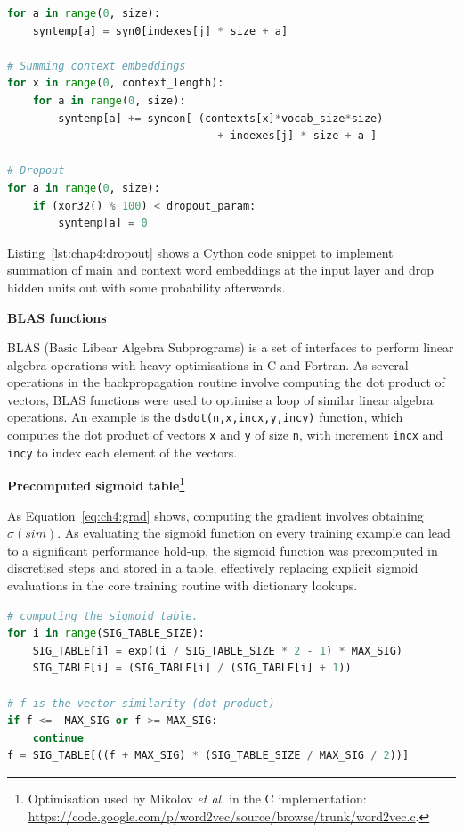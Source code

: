 \documentclass[a4paper,12pt,twoside,openright]{report}
\newcommand{\tb}{\vspace{10pt} \textbf}
\newcommand{\ti}{\textit}
\newcommand{\tx}{\texttt}
\begin{document}
\vspace{0.3cm}
\begin{lstlisting}[language=Python,caption={Cython code for dropout regularisation at the hidden layer.},label=lst:chap4:dropout]
for a in range(0, size):
    syntemp[a] = syn0[indexes[j] * size + a]

# Summing context embeddings 
for x in range(0, context_length):
    for a in range(0, size):
        syntemp[a] += syncon[ (contexts[x]*vocab_size*size)
        						 + indexes[j] * size + a ]

# Dropout
for a in range(0, size):
    if (xor32() % 100) < dropout_param:
        syntemp[a] = 0
\end{lstlisting}

Listing~\ref{lst:chap4:dropout} shows a Cython code snippet to implement summation of main and context word embeddings at the input layer and drop hidden units out with some probability afterwards.

\tb{BLAS functions}

BLAS (Basic Libear Algebra Subprograms) is a set of interfaces to perform linear algebra operations with heavy optimisations in C and Fortran. As several operations in the backpropagation routine involve computing the dot product of vectors, BLAS functions were used to optimise a loop of similar linear algebra operations. An example is the \tx{dsdot(n,x,incx,y,incy)} function, which computes the dot product of vectors \tx{x} and \tx{y} of size \tx{n}, with increment \tx{incx} and \tx{incy} to index each element of the vectors.

\tb{Precomputed sigmoid table}\footnote{Optimisation used by Mikolov \ti{et al.} in the C implementation: \url{https://code.google.com/p/word2vec/source/browse/trunk/word2vec.c}.}

As Equation~\ref{eq:ch4:grad} shows, computing the gradient involves obtaining $\sigma(sim)$. As evaluating the sigmoid function on every training example can lead to a significant performance hold-up, the sigmoid function was precomputed in discretised steps and stored in a table, effectively replacing explicit sigmoid evaluations in the core training routine with dictionary lookups.

\begin{lstlisting}[language=Python,caption={Cython code for precomputing and accessing sigmoid function.},label=lst:chap4:sigmoid]
# computing the sigmoid table.
for i in range(SIG_TABLE_SIZE):
	SIG_TABLE[i] = exp((i / SIG_TABLE_SIZE * 2 - 1) * MAX_SIG)
	SIG_TABLE[i] = (SIG_TABLE[i] / (SIG_TABLE[i] + 1))

# f is the vector similarity (dot product)
if f <= -MAX_SIG or f >= MAX_SIG:
	continue
f = SIG_TABLE[((f + MAX_SIG) * (SIG_TABLE_SIZE / MAX_SIG / 2))]
\end{lstlisting}
\end{document}
